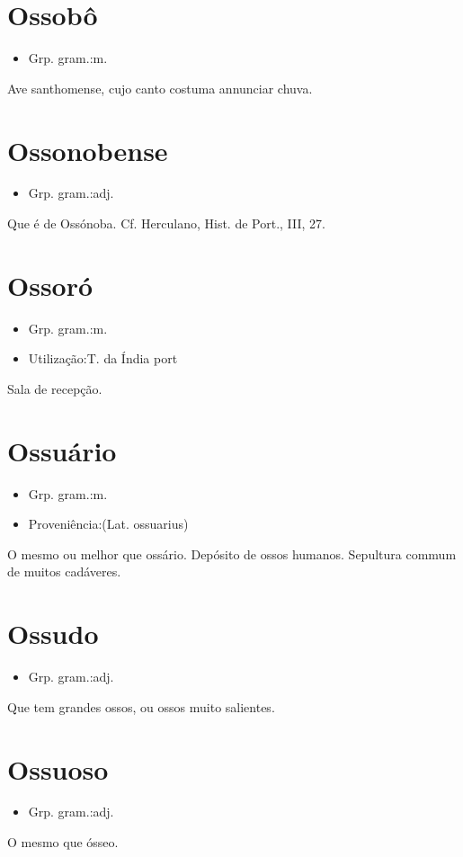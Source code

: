 \section{Ossobô}
\begin{itemize}
\item {Grp. gram.:m.}
\end{itemize}
Ave santhomense, cujo canto costuma annunciar chuva.
\section{Ossonobense}
\begin{itemize}
\item {Grp. gram.:adj.}
\end{itemize}
Que é de Ossónoba. Cf. Herculano, \textunderscore Hist. de Port.\textunderscore , III, 27.
\section{Ossoró}
\begin{itemize}
\item {Grp. gram.:m.}
\end{itemize}
\begin{itemize}
\item {Utilização:T. da Índia port}
\end{itemize}
Sala de recepção.
\section{Ossuário}
\begin{itemize}
\item {Grp. gram.:m.}
\end{itemize}
\begin{itemize}
\item {Proveniência:(Lat. \textunderscore ossuarius\textunderscore )}
\end{itemize}
O mesmo ou melhor que \textunderscore ossário\textunderscore .
Depósito de ossos humanos.
Sepultura commum de muitos cadáveres.
\section{Ossudo}
\begin{itemize}
\item {Grp. gram.:adj.}
\end{itemize}
Que tem grandes ossos, ou ossos muito salientes.
\section{Ossuoso}
\begin{itemize}
\item {Grp. gram.:adj.}
\end{itemize}
O mesmo que \textunderscore ósseo\textunderscore .
